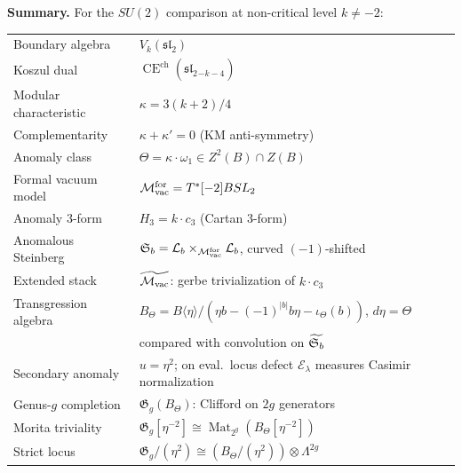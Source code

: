 \begin{construction}
\medskip
\noindent\textbf{Summary.}
For the \(SU(2)\) comparison at non-critical level \(k\neq -2\):
\begin{center}
\renewcommand{\arraystretch}{1.2}
\begin{tabular}{ll}
Boundary algebra & $V_k(\mathfrak{sl}_2)$ \\
Koszul dual & $\operatorname{CE}^{\mathrm{ch}}(\widehat{\mathfrak{sl}}_2{}_{-k-4})$ \\
Modular characteristic &
 $\kappa = 3(k+2)/4$ \\
Complementarity & $\kappa + \kappa' = 0$ (KM anti-symmetry) \\
Anomaly class &
 $\Theta = \kappa\cdot\omega_1 \in Z^2(B)\cap Z(B)$ \\
Formal vacuum model & $\mathcal{M}_{\mathrm{vac}}^{\mathrm{for}}=T^*[-2]BSL_2$ \\
Anomaly $3$-form & $H_3 = k\cdot c_3$ (Cartan $3$-form) \\
Anomalous Steinberg &
 $\mathfrak{S}_b = \mathcal{L}_b\times_{\mathcal{M}_{\mathrm{vac}}^{\mathrm{for}}}\mathcal{L}_b$, curved $(-1)$-shifted \\
Extended stack &
 $\widetilde{\mathcal{M}_{\mathrm{vac}}}$: gerbe trivialization of $k\cdot c_3$ \\
Transgression algebra &
 $B_\Theta = B\langle\eta\rangle/
 (\eta b-(-1)^{|b|}b\eta-\iota_\Theta(b))$, $d\eta=\Theta$ \\
 & compared with convolution on $\widetilde{\mathfrak{S}_b}$ \\
Secondary anomaly & $u=\eta^2$; on eval.\ locus
 defect $\mathcal E_\lambda$ measures Casimir normalization \\
Genus-$g$ completion &
 $\mathfrak G_g(B_\Theta)$: Clifford on $2g$ generators \\
Morita triviality &
 $\mathfrak G_g[\eta^{-2}]
 \cong\operatorname{Mat}_{2^g}(B_\Theta[\eta^{-2}])$ \\
Strict locus &
 $\mathfrak G_g/(\eta^2)
 \cong (B_\Theta/(\eta^2))\otimes\Lambda^{2g}$
\end{tabular}
\end{center}


\end{construction}
